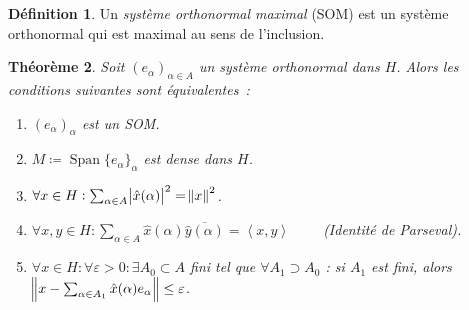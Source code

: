 \documentclass{report}
\DeclareMathOperator{\Span}{Span}
\newcommand{\scpr}[2]{\left\langle#1, #2\right\rangle}
\newtheorem{thm}{Théorème}[chapter]
\theoremstyle{definition}
\newtheorem{déf}[thm]{Définition}
\theoremstyle{remark}
\begin{document}
\begin{déf} Un \textit{système orthonormal maximal} (SOM) est un système orthonormal qui est maximal au sens de l'inclusion.
\end{déf}

\begin{thm}\label{thm:caractérisation SOM} Soit $(e_\alpha)_{\alpha \in A}$ un système orthonormal dans $H$. Alors les conditions suivantes sont équivalentes~:
\begin{enumerate}
	\item $(e_\alpha)_\alpha$ est un SOM.
	\item $M \coloneqq \Span \{e_\alpha\}_\alpha$ est dense dans $H$.
	\item $\forall x \in H : \sum_{\alpha \in A}\abs {\hat x(\alpha)}^2 = \norm x^2$.
	\item $\forall x, y \in H : \sum_{\alpha \in A}\hat x(\alpha)\overline {\hat y(\alpha)} = \scpr xy \qquad$ (Identité de Parseval).
	\item $\forall x \in H : \forall \varepsilon > 0 : \exists A_0 \subset A$ fini tel que $\forall A_1 \supset A_0$ : si $A_1$ est fini, alors $\norm {x - \sum_{\alpha \in A_1}\hat x(\alpha)e_\alpha} \leq \varepsilon$.
\end{enumerate}
\end{thm}
\end{document}
